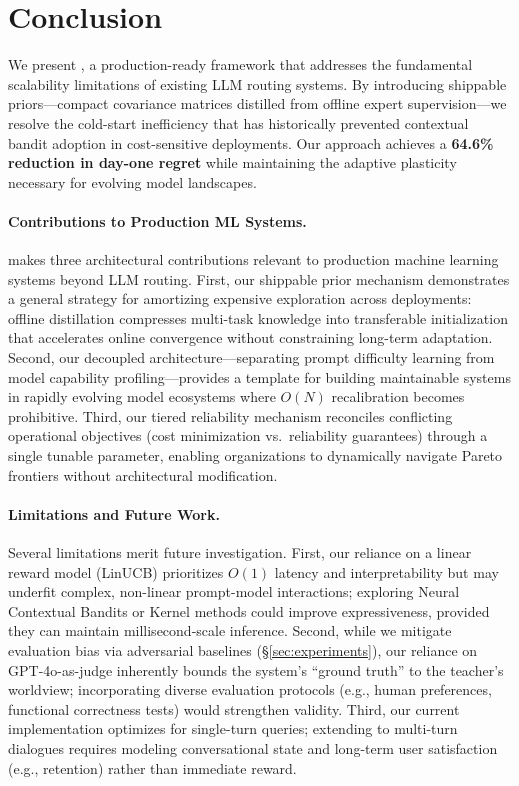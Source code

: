 
\section{Conclusion}
\label{sec:conclusion}

We present \ours{}, a production-ready framework that addresses the fundamental scalability limitations of existing LLM routing systems. By introducing shippable priors---compact covariance matrices distilled from offline expert supervision---we resolve the cold-start inefficiency that has historically prevented contextual bandit adoption in cost-sensitive deployments. Our approach achieves a \textbf{64.6\% reduction in day-one regret} while maintaining the adaptive plasticity necessary for evolving model landscapes.

\paragraph{Contributions to Production ML Systems.}
\ours{} makes three architectural contributions relevant to production machine learning systems beyond LLM routing. First, our shippable prior mechanism demonstrates a general strategy for amortizing expensive exploration across deployments: offline distillation compresses multi-task knowledge into transferable initialization that accelerates online convergence without constraining long-term adaptation. Second, our decoupled architecture---separating prompt difficulty learning from model capability profiling---provides a template for building maintainable systems in rapidly evolving model ecosystems where $O(N)$ recalibration becomes prohibitive. Third, our tiered reliability mechanism reconciles conflicting operational objectives (cost minimization vs.\ reliability guarantees) through a single tunable parameter, enabling organizations to dynamically navigate Pareto frontiers without architectural modification.

\paragraph{Limitations and Future Work.}
Several limitations merit future investigation. First, our reliance on a linear reward model (LinUCB) prioritizes $O(1)$ latency and interpretability but may underfit complex, non-linear prompt-model interactions; exploring Neural Contextual Bandits or Kernel methods could improve expressiveness, provided they can maintain millisecond-scale inference. Second, while we mitigate evaluation bias via adversarial baselines (\S\ref{sec:experiments}), our reliance on GPT-4o-as-judge inherently bounds the system's ``ground truth'' to the teacher's worldview; incorporating diverse evaluation protocols (e.g., human preferences, functional correctness tests) would strengthen validity. Third, our current implementation optimizes for single-turn queries; extending to multi-turn dialogues requires modeling conversational state and long-term user satisfaction (e.g., retention) rather than immediate reward.

